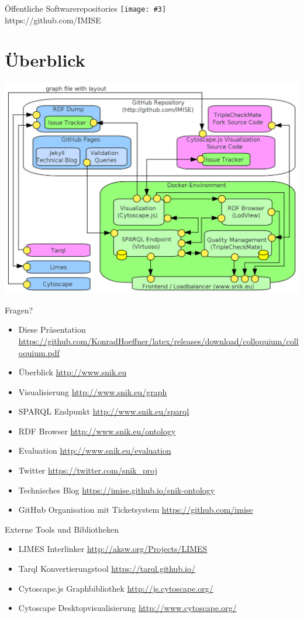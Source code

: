 \documentclass{beamer}
\newcommand{\imageslide}[3][]
{
\begin{frame}{#2}
\centering\texttt{[image: \#3]}
\\#1
\end{frame}
}
\begin{document}
\imageslide[https://github.com/IMISE]{Öffentliche Softwarerepositories}{img/github.png}

\section{Überblick}

\begin{frame}
\includegraphics[width=\textwidth]{img/architecture.png}
\end{frame}

\begin{frame}[fragile]{Fragen?}
\begin{itemize}
\item Diese Präsentation \url{https://github.com/KonradHoeffner/latex/releases/download/colloquium/colloquium.pdf}
\vspace{0.5em}%
\item Überblick \url{http://www.snik.eu}
\item Visualisierung \url{http://www.snik.eu/graph}
\item SPARQL Endpunkt \url{http://www.snik.eu/sparql}
\item RDF Browser \url{http://www.snik.eu/ontology}
\item Evaluation \url{http://www.snik.eu/evaluation}
\item Twitter \url{https://twitter.com/snik\_proj}
\item Technisches Blog \url{https://imise.github.io/snik-ontology}
\item GitHub Organisation mit Ticketsystem \url{https://github.com/imise}
\end{itemize}
\end{frame}

\begin{frame}[fragile]{Externe Tools und Bibliotheken}
\begin{itemize}
\item LIMES Interlinker \url{http://aksw.org/Projects/LIMES}
\item Tarql Konvertierungstool \url{https://tarql.github.io/}
\item Cytoscape.js Graphbibliothek \url{http://js.cytoscape.org/}
\item Cytoscape Desktopvisualisierung \url{http://www.cytoscape.org/}
\end{itemize}
\end{frame}
 
\end{document}
